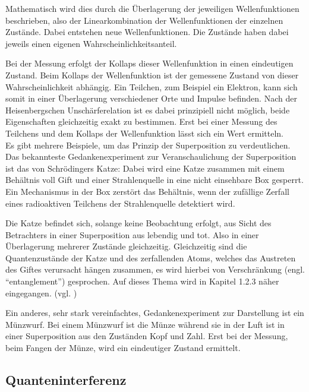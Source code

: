 Mathematisch wird dies durch die Überlagerung der jeweiligen Wellenfunktionen beschrieben, also der Linearkombination der Wellenfunktionen der einzelnen Zustände. Dabei entstehen neue Wellenfunktionen. Die Zustände haben dabei jeweils einen eigenen Wahrscheinlichkeitsanteil.


Bei der Messung erfolgt der Kollaps dieser Wellenfunktion in einen eindeutigen Zustand. Beim Kollaps der Wellenfunktion ist der gemessene Zustand von dieser Wahrscheinlichkeit abhängig. Ein Teilchen, zum Beispiel ein Elektron, kann sich somit in einer Überlagerung verschiedener Orte und Impulse befinden. Nach der Heisenbergschen Unschärferelation ist es dabei prinzipiell nicht möglich, beide Eigenschaften gleichzeitig exakt zu bestimmen. Erst bei einer Messung des Teilchens und dem Kollaps der Wellenfunktion lässt sich ein Wert ermitteln.\\

Es gibt mehrere Beispiele, um das Prinzip der Superposition zu verdeutlichen. Das bekannteste Gedankenexperiment zur Veranschaulichung der Superposition ist das von Schrödingers Katze: Dabei wird eine Katze zusammen mit einem Behältnis voll Gift und einer Strahlenquelle in eine nicht einsehbare Box gesperrt. Ein Mechanismus in der Box zerstört das Behältnis, wenn der zufällige Zerfall eines radioaktiven Teilchens der Strahlenquelle detektiert wird.


Die Katze befindet sich, solange keine Beobachtung erfolgt, aus Sicht des Betrachters in einer Superposition aus lebendig und tot. Also in einer Überlagerung mehrerer Zustände gleichzeitig. Gleichzeitig sind die Quantenzustände der Katze und des zerfallenden Atoms, welches das Austreten des Giftes verursacht hängen zusammen, es wird hierbei von Verschränkung (engl. ``entanglement'') gesprochen. Auf dieses Thema wird in Kapitel 1.2.3 näher eingegangen. (vgl. \cite[Ch. 2.1.3]{homeister_quantum_2022-1})


Ein anderes, sehr stark vereinfachtes, Gedankenexperiment zur Darstellung ist ein Münzwurf. Bei einem Münzwurf ist die Münze während sie in der Luft ist in einer Superposition aus den Zuständen Kopf und Zahl. Erst bei der Messung, beim Fangen der Münze, wird ein eindeutiger Zustand ermittelt.\\

\subsection{Quanteninterferenz}
\label{sec: Quanteninterferenz}

